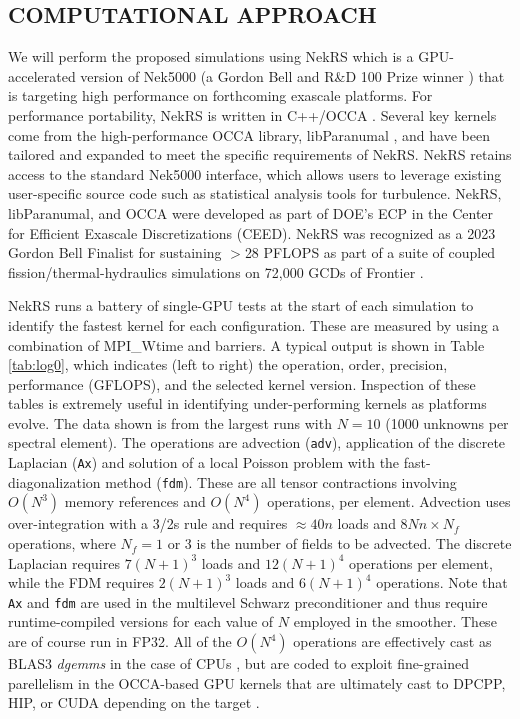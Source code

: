 

\vspace{-.00in}
\subsection*{COMPUTATIONAL APPROACH} 
\vspace{-.0in}

We will perform the proposed simulations using NekRS which is a GPU-accelerated
version of Nek5000 (a Gordon Bell and R\&D 100 Prize winner \cite{tufo99a})
that is targeting high performance on forthcoming exascale platforms.  For
performance portability, NekRS is written in C++/OCCA \cite{occa}.  Several key
kernels come from the high-performance OCCA library, libParanumal
\cite{ChalmersKarakusAustinSwirydowiczWarburton2020,streamParanumal2020}, and
have been tailored and expanded to meet the specific requirements of NekRS. 
NekRS retains access to the standard Nek5000 interface, which allows users to
leverage existing user-specific source code such as statistical analysis tools
for turbulence.  NekRS, libParanumal, and OCCA were developed as part of
DOE's ECP in the Center for Efficient Exascale Discretizations (CEED).
NekRS was recognized as a 2023 Gordon Bell Finalist for sustaining $>$28 PFLOPS
as part of a suite of coupled fission/thermal-hydraulics simulations on 72,000
GCDs of Frontier \cite{gb23}.  

NekRS runs a battery of single-GPU tests at the start of each simulation
to identify the fastest kernel for each configuration.  These are measured by
using a combination of MPI\_Wtime and barriers.  A typical output is shown in
Table \ref{tab:log0}, which indicates (left to right) the operation, order,
precision, performance (GFLOPS), and the selected kernel version.   Inspection
of these tables is extremely useful in identifying under-performing kernels as
platforms evolve.
The data shown is from the largest runs with $N=10$ (1000 unknowns per
spectral element).
The operations are advection ({\tt adv}),
application of the discrete Laplacian ({\tt Ax})
and
solution of a local Poisson problem with the fast-diagonalization method
({\tt fdm}).  These are all tensor contractions involving $O(N^3)$ memory
references and $O(N^4)$ operations, per element.
Advection uses over-integration with a 3/2s rule and requires $\approx 40n$
loads and 8$Nn \times N_f$ operations, where $N_f=1$ or 3 is the number of
fields to be advected. The discrete Laplacian requires
$7(N+1)^3$ loads and $12(N+1)^4$ operations per element, while the FDM requires
$2(N+1)^3$ loads and $6(N+1)^4$ operations.
Note that {\tt Ax} and {\tt fdm} are used in the multilevel Schwarz
preconditioner \cite{malachi2022a} and thus require runtime-compiled versions for
each value of $N$ employed in the smoother.  These are of course run in FP32.
All of the $O(N^4)$ operations are effectively cast as BLAS3 {\em dgemms} in
the case of CPUs \cite{dfm02}, but are coded to exploit fine-grained
parellelism in the OCCA-based GPU kernels that are ultimately cast
to DPCPP, HIP, or CUDA depending on the target \cite{nekrs}.


